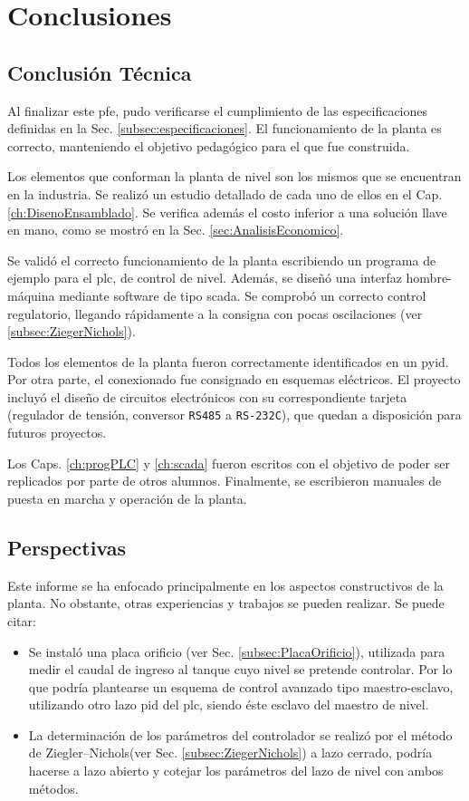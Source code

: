 \chapter{Conclusiones}
\label{ch:conclusiones}

\section{Conclusión Técnica}
\label{sec:ConclusionTecnica}

Al finalizar este \gls{pfe}, pudo verificarse el cumplimiento de las
especificaciones definidas en la Sec. \ref{subsec:especificaciones}.
El funcionamiento de la planta es correcto, manteniendo el objetivo pedagógico
para el que fue construida.

Los elementos que conforman la planta de nivel son los mismos que se
encuentran en la industria.
Se realizó un estudio detallado de cada uno de ellos en el Cap.
\ref{ch:DisenoEnsamblado}.
Se verifica además el costo inferior a una solución llave en mano, como se
mostró en la Sec. \ref{sec:AnalisisEconomico}.

Se validó el correcto funcionamiento de la planta escribiendo un programa de
ejemplo para el \gls{plc}, de control de nivel.
Además, se diseñó una interfaz hombre-máquina mediante software de tipo
\gls{scada}.
Se comprobó un correcto control regulatorio, llegando rápidamente a la consigna
con pocas oscilaciones (ver \ref{subsec:ZiegerNichols}).

Todos los elementos de la planta fueron correctamente identificados en un
\gls{pyid}.
Por otra parte, el conexionado fue consignado en esquemas eléctricos.
El proyecto incluyó el diseño de circuitos electrónicos con su correspondiente
tarjeta (regulador de tensión, conversor \verb|RS485| a \verb|RS-232C|), que
quedan a disposición para futuros proyectos.

Los Caps. \ref{ch:progPLC} y \ref{ch:scada} fueron escritos con el
objetivo de poder ser replicados por parte de otros alumnos.
Finalmente, se escribieron manuales de puesta en marcha y operación de la
planta.

\section{Perspectivas}
\label{sec:Perspectivas}
Este informe se ha enfocado principalmente en los aspectos constructivos
de la planta.
No obstante, otras experiencias y trabajos se pueden realizar. Se puede citar:
\begin{itemize}
\item Se instaló una placa orificio (ver Sec. \ref{subsec:PlacaOrificio}), 
utilizada
para medir el caudal de ingreso al tanque cuyo nivel se pretende controlar. Por 
lo que podría plantearse un esquema de control avanzado tipo maestro-esclavo, 
utilizando otro lazo \gls{pid} del \gls{plc}, siendo éste esclavo del maestro
de nivel.
\item La determinación de los parámetros del controlador se realizó por 
el método de Ziegler–Nichols(ver Sec. \ref{subsec:ZiegerNichols}) a lazo 
cerrado, podría hacerse a lazo abierto y cotejar los parámetros del lazo de 
nivel con ambos métodos.
\end{itemize}

